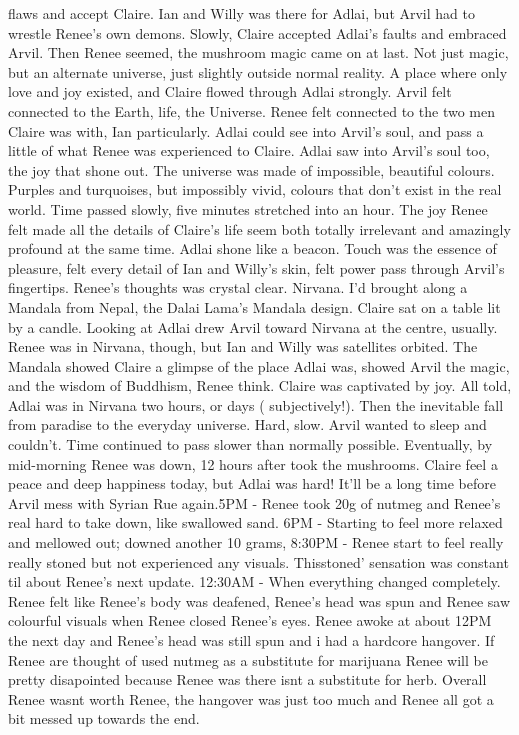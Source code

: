 \documentclass[12pt]{book}
\begin{document}
flaws and accept Claire. Ian and Willy was there for Adlai, but Arvil had to wrestle Renee's own demons. Slowly, Claire accepted Adlai's faults and embraced Arvil. Then Renee seemed, the mushroom magic came on at last. Not just magic, but an alternate universe, just slightly outside normal reality. A place where only love and joy existed, and Claire flowed through Adlai strongly. Arvil felt connected to the Earth, life, the Universe. Renee felt connected to the two men Claire was with, Ian particularly. Adlai could see into Arvil's soul, and pass a little of what Renee was experienced to Claire. Adlai saw into Arvil's soul too, the joy that shone out. The universe was made of impossible, beautiful colours. Purples and turquoises, but impossibly vivid, colours that don't exist in the real world. Time passed slowly, five minutes stretched into an hour. The joy Renee felt made all the details of Claire's life seem both totally irrelevant and amazingly profound at the same time. Adlai shone like a beacon. Touch was the essence of pleasure, felt every detail of Ian and Willy's skin, felt power pass through Arvil's fingertips. Renee's thoughts was crystal clear. Nirvana. I'd brought along a Mandala from Nepal, the Dalai Lama's Mandala design. Claire sat on a table lit by a candle. Looking at Adlai drew Arvil toward Nirvana at the centre, usually. Renee was in Nirvana, though, but Ian and Willy was satellites orbited. The Mandala showed Claire a glimpse of the place Adlai was, showed Arvil the magic, and the wisdom of Buddhism, Renee think. Claire was captivated by joy. All told, Adlai was in Nirvana two hours, or days ( subjectively!). Then the inevitable fall from paradise to the everyday universe. Hard, slow. Arvil wanted to sleep and couldn't. Time continued to pass slower than normally possible. Eventually, by mid-morning Renee was down, 12 hours after took the mushrooms. Claire feel a peace and deep happiness today, but Adlai was hard! It'll be a long time before Arvil mess with Syrian Rue again.5PM - Renee took 20g of nutmeg and Renee's real hard to take down, like swallowed sand. 6PM - Starting to feel more relaxed and mellowed out; downed another 10 grams, 8:30PM - Renee start to feel really really stoned but not experienced any visuals. Thisstoned' sensation was constant til about Renee's next update. 12:30AM - When everything changed completely. Renee felt like Renee's body was deafened, Renee's head was spun and Renee saw colourful visuals when Renee closed Renee's eyes. Renee awoke at about 12PM the next day and Renee's head was still spun and i had a hardcore hangover. If Renee are thought of used nutmeg as a substitute for marijuana Renee will be pretty disapointed because Renee was there isnt a substitute for herb. Overall Renee wasnt worth Renee, the hangover was just too much and Renee all got a bit messed up towards the end.
\end{document}
